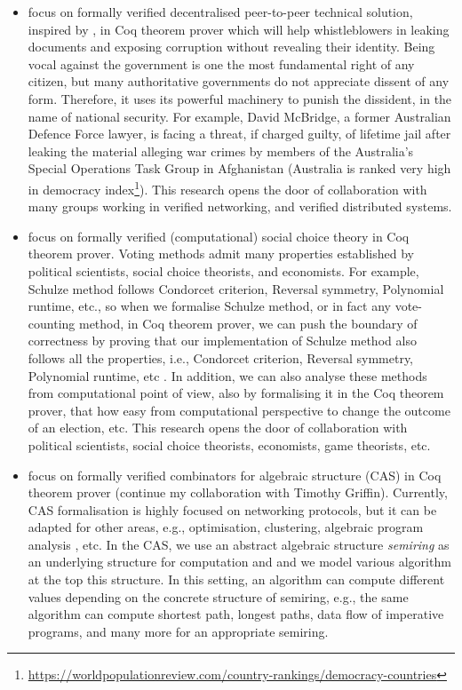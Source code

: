\documentclass[a4paper]{article}
\begin{document}
\begin{itemize}
\item focus on formally verified decentralised peer-to-peer technical solution, inspired by 
\cite{liu2004linkable, Clarke2001, schimmer2009peer}, in Coq theorem prover which will help 
whistleblowers in leaking documents and exposing 
corruption without revealing their identity. 
Being vocal against the government is one the most fundamental right of any citizen, but many 
authoritative governments do not appreciate dissent of any form. Therefore, it uses 
its powerful machinery to punish the dissident, in the name of national security. For example,
David McBridge, a former Australian Defence Force lawyer,  
is facing a threat, if charged guilty, of lifetime jail after
leaking the material alleging war crimes by members of the Australia's Special Operations
Task Group in Afghanistan (Australia is ranked very high in 
democracy index\footnote{\url{https://worldpopulationreview.com/country-rankings/democracy-countries}}). 
This research opens the door of collaboration with many groups working in verified 
networking, and verified distributed systems. 



\item focus on formally verified (computational) social choice theory in Coq theorem prover. 
	Voting methods admit many properties established by political scientists, social choice theorists, 
	and economists. For example, Schulze method follows Condorcet criterion, Reversal symmetry,
	Polynomial runtime, etc., so when we formalise Schulze method, or in fact any vote-counting method,
	in Coq theorem prover, we can push the boundary of correctness by proving that our 
	implementation of Schulze method also follows all the properties, i.e.,  Condorcet criterion, Reversal symmetry,
	Polynomial runtime, etc  \cite{tiwari2021machine}. 
	In addition, we can also analyse these 
	methods from computational point of view, also by formalising it in the Coq theorem prover, 
	that how easy from computational perspective to change the outcome of an election, etc. 
	This research opens the door of collaboration with political scientists, 
	social choice theorists, economists, game theorists, etc. 

	

\item focus on formally verified combinators for algebraic structure (CAS) in Coq theorem prover 
	(continue my collaboration with Timothy Griffin). 
	Currently, CAS formalisation is highly focused on networking protocols, but it can be 
	adapted for other areas, e.g., optimisation, clustering, algebraic program 
	analysis , etc. In the CAS, we use an abstract algebraic structure 
	\emph{semiring} as an underlying structure
	for computation and and we model various algorithm at the top this 
	structure. In this setting, an algorithm can compute different values depending 
	on the concrete structure of semiring, e.g., the same algorithm 
	can compute shortest path, longest paths, 
	data flow of imperative programs, and many more \cite{gondran2008graphs} 
	for an appropriate semiring.
	

\end{itemize}
\end{document}

